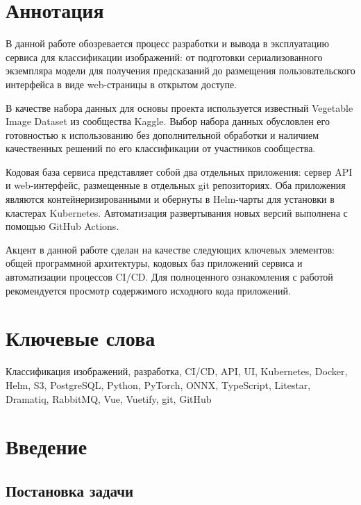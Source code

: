 \documentclass[a4paper,12pt]{extarticle}
\begin{document}
\newpage
\setcounter{page}{2}

{
	\hypersetup{linkcolor=black}
	\tableofcontents
}

\newpage

\newpage
\section*{Аннотация}   %
В данной работе обозревается процесс разработки и вывода в эксплуатацию сервиса для классификации
изображений: от подготовки сериализованного экземпляра модели для получения предсказаний до
размещения пользовательского интерфейса в виде web-страницы в открытом доступе.

В качестве набора данных для основы проекта используется известный Vegetable Image Dataset из
сообщества Kaggle. Выбор набора данных обусловлен его готовностью к использованию без дополнительной
обработки и наличием качественных решений по его классификации от участников сообщества.

Кодовая база сервиса представляет собой два отдельных приложения: сервер API и web-интерфейс,
размещенные в отдельных git репозиториях. Оба приложения являются контейнеризированными и обернуты в
Helm-чарты для установки в кластерах Kubernetes. Автоматизация развертывания новых версий выполнена
с помощью GitHub Actions.

Акцент в данной работе сделан на качестве следующих ключевых элементов: общей программной архитектуры,
кодовых баз приложений сервиса и автоматизации процессов CI/CD. Для полноценного ознакомления с
работой рекомендуется просмотр содержимого исходного кода приложений.


\section*{Ключевые слова}
Классификация изображений, разработка, CI/CD, API, UI, Kubernetes, Docker, Helm, S3, PostgreSQL,
Python, PyTorch, ONNX, TypeScript, Litestar, Dramatiq, RabbitMQ, Vue, Vuetify, git, GitHub
\pagebreak

\section{Введение}

\subsection{Постановка задачи}
\end{document}
